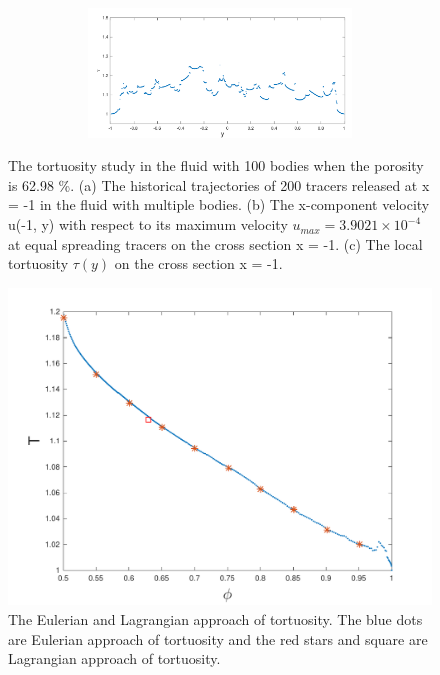 \documentclass[preprint, 10pt]{elsarticle}
\begin{document}
\begin{figure}[H]
\begin{subfigure}[b]{0.45\textwidth}
\begin{subfigure}[b]{\textwidth}
\caption{}
\end{subfigure}
\begin{subfigure}[b]{\textwidth}
\includegraphics*[width =\linewidth]{./figs/tort_local100}
\caption{}
\end{subfigure}
\end{subfigure}

\caption{\label{fig:Eroding100tort} The tortuosity study in the fluid with 100 bodies 
when the porosity is 62.98 \%.
(a) The historical trajectories of 
200 tracers released at x = -1 in the fluid with multiple bodies.
(b) The 
x-component velocity u(-1, y) with respect to its maximum velocity $u_{max}=3.9021
\times 10^{-4}$ at equal spreading tracers on the cross section x = -1. 
(c) The local tortuosity $\tau(y)$ on the cross section x = -1. 
}
\end{figure}

\begin{figure}[H]
\center
\includegraphics*[width =0.5\linewidth]{./figs/tort_eulerian100}
\caption{\label{fig:Eroding100tort_all} The Eulerian and Lagrangian approach of tortuosity. 
The blue dots are Eulerian approach of tortuosity and the red stars and 
square are Lagrangian approach of tortuosity.}
\end{figure}
\end{document}
